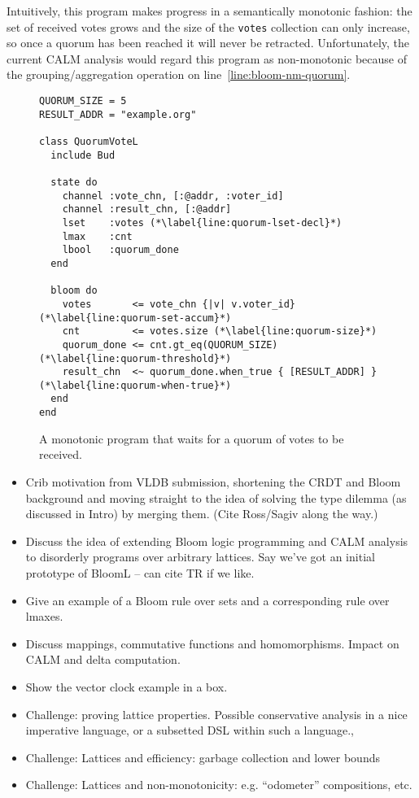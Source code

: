 Intuitively, this program makes progress in a semantically monotonic fashion:
the set of received votes grows and the size of the \texttt{votes} collection
can only increase, so once a quorum has been reached it will never be
retracted. Unfortunately, the current CALM analysis would regard this program as
non-monotonic because of the grouping/aggregation operation on
line~\ref{line:bloom-nm-quorum}.

\begin{figure}[t]
\begin{scriptsize}
\begin{lstlisting}
QUORUM_SIZE = 5
RESULT_ADDR = "example.org"

class QuorumVoteL
  include Bud

  state do
    channel :vote_chn, [:@addr, :voter_id]
    channel :result_chn, [:@addr]
    lset    :votes (*\label{line:quorum-lset-decl}*)
    lmax    :cnt
    lbool   :quorum_done
  end

  bloom do
    votes       <= vote_chn {|v| v.voter_id} (*\label{line:quorum-set-accum}*)
    cnt         <= votes.size (*\label{line:quorum-size}*)
    quorum_done <= cnt.gt_eq(QUORUM_SIZE) (*\label{line:quorum-threshold}*)
    result_chn  <~ quorum_done.when_true { [RESULT_ADDR] } (*\label{line:quorum-when-true}*)
  end
end
\end{lstlisting}
\end{scriptsize}
\caption{A monotonic \blooml program that waits for a quorum of votes to be received.}
\label{fig:lattice-quorum}
\end{figure}

\begin{itemize}
\item Crib motivation from VLDB submission, shortening the CRDT and Bloom background and moving straight to the idea of solving the type dilemma (as discussed in Intro) by merging them. (Cite Ross/Sagiv along the way.)
\item Discuss the idea of extending Bloom logic programming and CALM analysis to disorderly programs over arbitrary lattices. Say we've got an initial prototype of BloomL -- can cite TR if we like.
\item Give an example of a Bloom rule over sets and a corresponding rule over lmaxes.  
\item Discuss mappings, commutative functions and homomorphisms.  Impact on CALM and delta computation.
\item Show the vector clock example in a box.
\item Challenge: proving lattice properties. Possible conservative analysis in a nice imperative language, or a subsetted DSL within such a language., 
\item Challenge: Lattices and efficiency: garbage collection and lower bounds
\item Challenge: Lattices and non-monotonicity: e.g. ``odometer'' compositions, etc.
\end{itemize}

